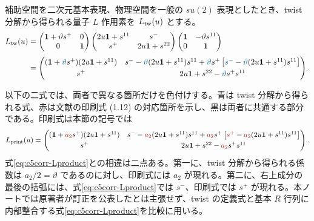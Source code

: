 補助空間を二次元基本表現、物理空間を一般の $su(2)$ 表現としたとき、twist 分解から得られる量子 $L$ 作用素を $L_{\rm tw}(u)$ とする。
\begin{align}
L_{\rm tw}(u)
&=
\begin{pmatrix}\mathbf1+\vartheta s^+&0\\0&\mathbf1\end{pmatrix}
\begin{pmatrix}2u\mathbf1+s^{11}&s^-\\s^+&2u\mathbf1+s^{22}\end{pmatrix}
\begin{pmatrix}\mathbf1&-\vartheta s^{11}\\0&\mathbf1\end{pmatrix}
\nonumber\\[1mm]
&=
\begin{pmatrix}
(\mathbf1+\textcolor{MidnightBlue}{\vartheta}s^+)(2u\mathbf1+s^{11})
&
s^--\textcolor{MidnightBlue}{\vartheta}(2u\mathbf1+s^{11})s^{11}
+\textcolor{MidnightBlue}{\vartheta}s^+
\left[\textcolor{MidnightBlue}{s^-}-\textcolor{MidnightBlue}{\vartheta}(2u\mathbf1+s^{11})s^{11}\right]
\\[1mm]
s^+
&2u\mathbf1+s^{22}-\textcolor{MidnightBlue}{\vartheta}s^+s^{11}
\end{pmatrix}.
\label{eq:c5corr-Lproduct}
\end{align}

以下の二式では、両者で異なる箇所だけを色付けする。青は twist 分解から得られる式、赤は文献\cite{DFN2026}の印刷式 (1.12) の対応箇所を示し、黒は両者に共通する部分である。印刷式は本節の記号では
\begin{equation}
L_{\rm print}(u)=
\begin{pmatrix}
(\mathbf1+\textcolor{BrickRed}{a_2}s^+)(2u\mathbf1+s^{11})
&
s^--\textcolor{BrickRed}{a_2}(2u\mathbf1+s^{11})s^{11}
+\textcolor{BrickRed}{a_2}s^+
\left[\textcolor{BrickRed}{s^+}-\textcolor{BrickRed}{a_2}(2u\mathbf1+s^{11})s^{11}\right]
\\[1mm]
s^+
&2u\mathbf1+s^{22}-\textcolor{BrickRed}{a_2}s^+s^{11}
\end{pmatrix}.
\label{eq:c5corr-Lprint}
\end{equation}
式\eqref{eq:c5corr-Lproduct}との相違は二点ある。第一に、twist 分解から得られる係数は $a_2/2=\vartheta$ であるのに対し、印刷式には $a_2$ が現れる。第二に、右上成分の最後の括弧には、式\eqref{eq:c5corr-Lproduct}では $s^-$、印刷式では $s^+$ が現れる。本ノートでは原著者が訂正を公表したとは主張せず、twist の定義式と基本 $R$ 行列に内部整合する式\eqref{eq:c5corr-Lproduct}を比較に用いる。

